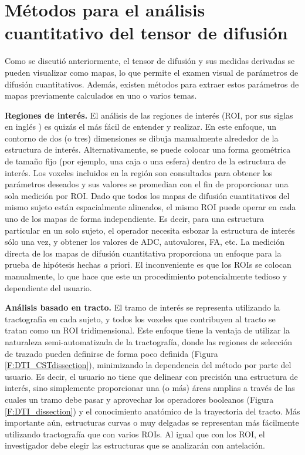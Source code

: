 \section{Métodos para el análisis cuantitativo del tensor de difusión}

Como se discutió anteriormente, el tensor de difusión y sus medidas derivadas se pueden visualizar como mapas, lo que permite el examen visual de parámetros de difusión cuantitativos. Además, existen métodos para extraer estos parámetros de mapas previamente calculados en uno o varios temas.

\textbf {Regiones de interés.} El análisis de las regiones de interés (ROI, por sus siglas en inglés ) es quizás el más fácil de entender y realizar. En este enfoque, un contorno de dos (o tres) dimensiones se dibuja manualmente alrededor de la estructura de interés. Alternativamente, se puede colocar una forma geométrica de tamaño fijo (por ejemplo, una caja o una esfera) dentro de la estructura de interés. Los voxeles incluidos en la región son consultados para obtener los parámetros deseados y sus valores se promedian con el fin de proporcionar una sola medición por ROI. Dado que todos los mapas de difusión cuantitativos del mismo sujeto están espacialmente alineados, el mismo ROI puede operar en cada uno de los mapas de forma independiente. Es decir, para una estructura particular en un solo sujeto, el operador necesita esbozar la estructura de interés sólo una vez, y obtener los valores de ADC, autovalores, FA, etc. La medición directa de los mapas de difusión cuantitativa proporciona un enfoque para la prueba de hipótesis hechas {\emph a priori}. El inconveniente es que los ROIs se colocan manualmente, lo que hace que este un procedimiento potencialmente tedioso y dependiente del usuario.

\textbf{Análisis basado en tracto.} El tramo de interés se representa utilizando la tractografía en cada sujeto, y todos los voxeles que contribuyen al tracto se tratan como un ROI tridimensional. Este enfoque tiene la ventaja de utilizar la naturaleza semi-automatizada de la tractografía, donde las regiones de selección de trazado pueden definirse de forma poco definida (Figura \ref{F:DTI_CSTdissection}), minimizando la dependencia del método por parte del usuario. Es decir, el usuario no tiene que delinear con precisión una estructura de interés, sino simplemente proporcionar una (o más) áreas amplias a través de las cuales un tramo debe pasar y aprovechar los operadores booleanos (Figura \ref{F:DTI_dissection}) y el conocimiento anatómico de la trayectoria del tracto. Más importante aún,  estructuras curvas o muy delgadas se representan más fácilmente utilizando tractografía que con varios ROIs. Al igual que con los ROI, el investigador debe elegir las estructuras que se analizarán con antelación.

